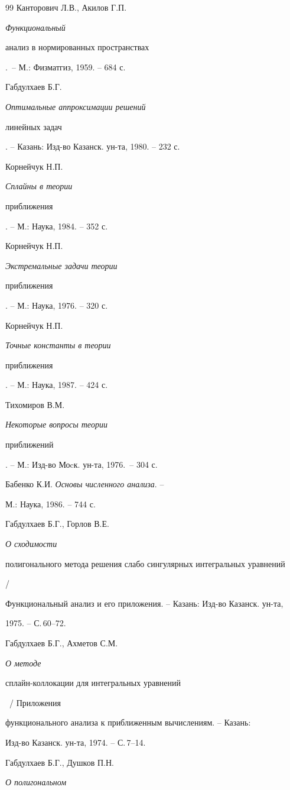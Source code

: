 \begin{thebibliography}{99}
Канторович Л.В., Акилов Г.П. {\em Функциональный


анализ в нормированных пространствах}.~-- М.: Физматгиз, 1959. -- 684 с.




Габдулхаев Б.Г. {\em Оптимальные аппроксимации решений


линейных задач}. -- Казань: Изд-во Казанск. ун-та, 1980. -- 232 с.




Корнейчук Н.П. {\em Сплайны в теории


приближения}. -- М.: Наука, 1984. -- 352 с.




Корнейчук Н.П. {\em Экстремальные задачи теории


 приближения}. -- М.: Наука, 1976. -- 320 с.




Корнейчук Н.П. {\em Точные константы в теории


приближения}. -- М.: Наука, 1987. -- 424 с.




Тихомиров В.М. {\em Некоторые вопросы теории


приближений}. -- М.: Изд-во Моcк. ун-та, 1976.~-- 304 с.




Бабенко К.И. {\em Основы численного анализа}. --


М.: Наука, 1986. -- 744 с.




Габдулхаев Б.Г., Горлов В.Е. {\em О сходимости


полигонального метода решения слабо сингулярных интегральных уравнений} /


Функциональный анализ и его приложения. -- Казань: Изд-во Казанск. ун-та,


1975. -- С.\,60--72.




Габдулхаев Б.Г., Ахметов С.М. {\em О методе


сплайн-коллокации для интегральных уравнений}~/ Приложения


функционального анализа к приближенным вычислениям. -- Казань:


Изд-во Казанск. ун-та, 1974. -- С.\,7--14.




Габдулхаев Б.Г., Душков П.Н. {\em О полигональном


}
\end{thebibliography}
